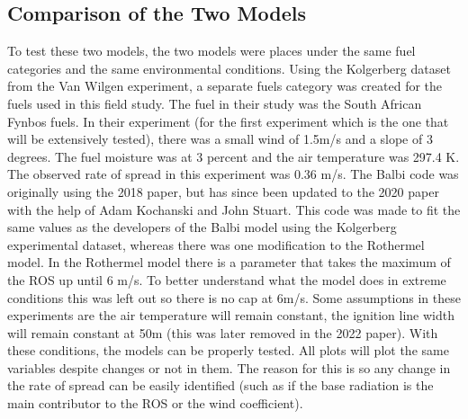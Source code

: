 \documentclass{article}
\begin{document}
\subsection{Comparison of the Two Models}
\indent To test these two models, the two models were places under the same fuel categories and the same environmental conditions. Using the Kolgerberg dataset from the Van Wilgen experiment, a separate fuels category was created for the fuels used in this field study. The fuel in their study was the South African Fynbos fuels. In their experiment (for the first experiment which is the one that will be extensively tested), there was a small wind of 1.5m/s and a slope of 3 degrees. The fuel moisture was at 3 percent and the air temperature was 297.4 K. The observed rate of spread in this experiment was 0.36 m/s. The Balbi code was originally using the 2018 paper, but has since been updated to the 2020 paper with the help of Adam Kochanski and John Stuart. This code was made to fit the same values as the developers of the Balbi model using the Kolgerberg experimental dataset, whereas there was one modification to the Rothermel model. In the Rothermel model there is a parameter that takes the maximum of the ROS up until 6 m/s. To better understand what the model does in extreme conditions this was left out so there is no cap at 6m/s. Some assumptions in these experiments are the air temperature will remain constant, the ignition line width will remain constant at 50m (this was later removed in the 2022 paper). With these conditions, the models can be properly tested. All plots will plot the same variables despite changes or not in them. The reason for this is so any change in the rate of spread can be easily identified (such as if the base radiation is the main contributor to the ROS or the wind coefficient). 
\end{document}
